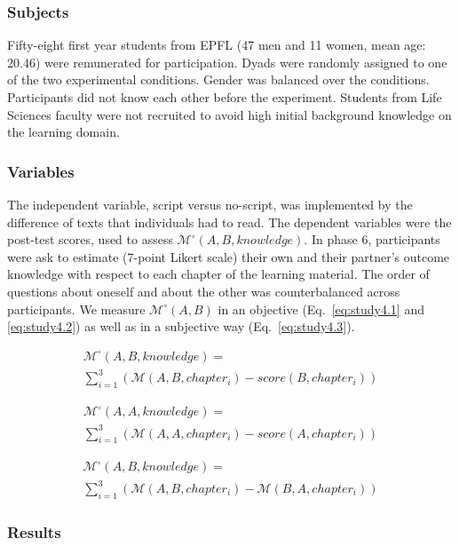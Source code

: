 \documentclass[natbib]{svjour3}
\newcommand{\M}[3]{{\mathcal{M}(#1, #2, #3)}}
\newcommand{\Model}[3]{{$\mathcal{M}^{\circ}(#1, #2, #3)$}}
\newcommand{\gModel}[2]{{$\mathcal{M}^{\circ}(#1, #2)$}}
\newcommand{\Mdeg}[3]{{\mathcal{M}^{\circ}(#1, #2, #3)}}
\begin{document}
\subsubsection*{Subjects}

Fifty-eight first year students from EPFL (47 men and 11 women, mean age: 20.46)
were remunerated for participation. Dyads were randomly assigned to one of the
two experimental conditions. Gender was balanced over the conditions.
Participants did not know each other before the experiment. Students from Life
Sciences faculty were not recruited to avoid high initial background knowledge on the
learning domain.

\subsubsection*{Variables}

The independent variable, script versus no-script, was implemented by the
difference of texts that individuals had to read.  The dependent variables were
the post-test scores, used to assess \Model{A}{B}{knowledge}. In phase 6,
participants were ask to estimate (7-point Likert scale) their own and their
partner's outcome knowledge with respect to each chapter of the learning
material. The order of questions about oneself and about the other was
counterbalanced across participants. We measure \gModel{A}{B} in an objective
(Eq.~\ref{eq:study4.1} and \ref{eq:study4.2}) as well as in a subjective way
(Eq.~\ref{eq:study4.3}).

\begin{multline} \label{eq:study4.1}
    \Mdeg{A}{B}{knowledge} = \\
        \sum_{i=1}^{3} (\M{A}{B}{chapter_i} - score(B, chapter_i))
\end{multline}

\begin{multline} \label{eq:study4.2}
    \Mdeg{A}{A}{knowledge} = \\
        \sum_{i=1}^{3}  (\M{A}{A}{chapter_i} - score(A, chapter_i))
\end{multline}

\begin{multline} \label{eq:study4.3}
    \Mdeg{A}{B}{knowledge} = \\
        \sum_{i=1}^{3}  (\M{A}{B}{chapter_i} - \M{B}{A}{chapter_i})
\end{multline}

\subsubsection*{Results}
\end{document}
